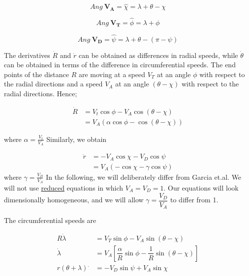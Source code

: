 \begin{equation}
	Ang\ \boldsymbol{V_A} = \hat{\chi} = \lambda+\theta-\chi
\end{equation}

\begin{equation}
Ang\ \boldsymbol{V_T} = \hat{\phi} = \lambda+\phi
\end{equation}

\begin{equation}
Ang\ \boldsymbol{V_D} = \hat{\psi} = \lambda+\theta-(\pi - \psi)
\end{equation}



The derivatives $\dot{R}$ and $\dot{r}$ can be obtained as differences in radial speeds, while $\dot{\theta}$ can be obtained in terms of the difference in circumferential speeds. The end points of the distance $R$ are moving at a speed $V_T$ at an angle $\phi$ with respect to the radial directions and a speed $V_A$ at an angle $(\theta - \chi)$ with respect to the radial directions. Hence;

\begin{equation}
\begin{split}
\dot{R} &= V_t \cos \phi - V_A \cos(\theta - \chi)\\
&= V_A (\alpha \cos \phi - \cos(\theta - \chi))
\end{split}
\label{Rdot}
\end{equation}

where $\alpha=\frac{V_t}{V_A}$
Similarly, we obtain 

\begin{equation}
\begin{split}
\dot{r} &= -V_A \cos \chi - V_D \cos\psi\\
&= V_A (- \cos \chi - \gamma\cos\psi)
\end{split}
\label{rdot}
\end{equation}
where $\gamma=\frac{V_D}{V_A}$
In the following, we will deliberately differ from Garcia et.al. \cite{pachter2014active}
We will not use \underline{reduced} equations in which $V_A = V_D = 1$.
Our equations will look dimensionally homogeneous, and we will allow $\gamma = \dfrac{V_D}{V_A}$ to differ from 1.

The circumferential speeds are

\begin{equation*}
\begin{split}
R \dot{\lambda}& = V_T \sin \phi - V_A \sin (\theta - \chi)\\
\dot{\lambda} &= V_A [\dfrac{\alpha}{R} \sin \phi - \dfrac{1}{R} \sin (\theta - \chi)]\\
r (\theta + \lambda)^. &= - V_D \sin \psi + V_A \sin \chi
\end{split}
\end{equation*}  

